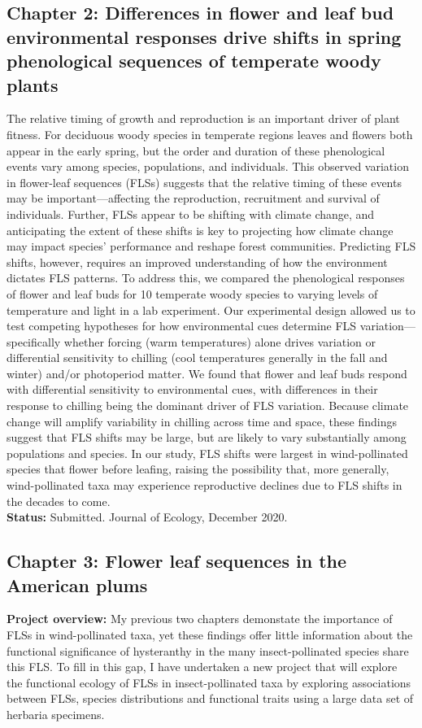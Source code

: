 \documentclass[11pt]{article}\usepackage[]{graphicx}\usepackage[]{color}
\begin{document}
\subsection*{Chapter 2: Differences in flower and leaf bud environmental responses drive shifts in spring phenological sequences of temperate woody plants}
The relative timing of growth and reproduction is an important driver of plant fitness. For deciduous woody species in temperate regions leaves and flowers both appear in the early spring, but the order and duration of these phenological events vary among species, populations, and individuals. This observed variation in flower-leaf sequences (FLSs) suggests that the relative timing of these events may be important---affecting the reproduction, recruitment and survival of individuals. Further, FLSs appear to be shifting with climate change, and anticipating the extent of these shifts is key to projecting how climate change may impact species' performance and reshape forest communities. Predicting FLS shifts, however, requires an improved understanding of how the environment dictates FLS patterns. To address this, we compared the phenological responses of flower and leaf buds for 10 temperate woody species to varying levels of temperature and light in a lab experiment. Our experimental design allowed us to test competing hypotheses for how environmental cues determine FLS variation---specifically whether forcing (warm temperatures) alone drives variation or differential sensitivity to chilling (cool temperatures generally in the fall and winter) and/or photoperiod matter. We found that flower and leaf buds respond with differential sensitivity to environmental cues, with differences in their response to chilling being the dominant driver of FLS variation. Because climate change will amplify variability in chilling across time and space, these findings suggest that FLS shifts may be large, but are likely to vary substantially among populations and species. In our study, FLS shifts were largest in wind-pollinated species that flower before leafing, raising the possibility that, more generally, wind-pollinated taxa may experience reproductive declines due to FLS shifts in the decades to come.\\

\textbf{Status:} Submitted. Journal of Ecology, December 2020.

\subsection*{Chapter 3: Flower leaf sequences in the American plums}
\textbf{Project overview:} My previous two chapters demonstate the importance of FLSs in wind-pollinated taxa, yet these findings offer little information about the functional significance of hysteranthy in the many insect-pollinated species share this FLS. To fill in this gap, I have undertaken a new project that will explore the functional ecology of FLSs in insect-pollinated taxa by exploring associations between FLSs, species distributions and functional traits using a large data set of herbaria specimens.\\
\end{document}
